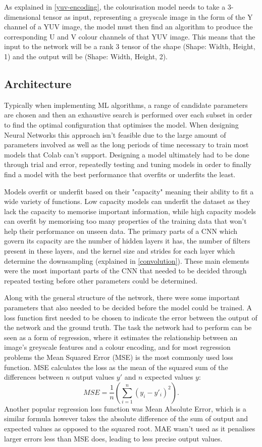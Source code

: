 \documentclass{l4proj}
\begin{document}
As explained in \ref{yuv-encoding}, the colourisation model needs to take a 3-dimensional tensor as input, representing a greyscale image in the form of the Y channel of a YUV image, the model must then find an algorithm to produce the corresponding U and V colour channels of that YUV image. This means that the input to the network will be a rank 3 tensor of the shape (Shape: Width, Height, 1) and the output will be (Shape: Width, Height, 2).

\subsection{Architecture}
Typically when implementing ML algorithms, a range of candidate parameters are chosen and then an exhaustive search is performed over each subset in order to find the optimal configuration that optimises the model. When designing Neural Networks this approach isn't feasible due to the large amount of parameters involved as well as the long periods of time necessary to train most models that Colab can't support. Designing a model ultimately had to be done through trial and error, repeatedly testing and tuning models in order to finally find a model with the best performance that overfits or underfits the least.

Models overfit or underfit based on their "capacity" meaning their ability to fit a wide variety of functions. Low capacity models can underfit the dataset as they lack the capacity to memorise important information, while high capacity models can overfit by memorising too many properties of the training data that won't help their performance on unseen data\cite[p.110]{Goodfellow}. The primary parts of a CNN which govern its capacity are the number of hidden layers it has, the number of filters present in these layers, and the kernel size and strides for each layer which determine the downsampling (explained in \ref{convolution}). These main elements were the most important parts of the CNN that needed to be decided through repeated testing before other parameters could be determined.

Along with the general structure of the network, there were some important parameters that also needed to be decided before the model could be trained. A loss function first needed to be chosen to indicate the error between the output of the network and the ground truth. The task the network had to perform can be seen as a form of regression, where it estimates the relationship between an image's greyscale features and a colour encoding, and for most regression problems the  Mean Squared Error (MSE) is the most commonly used loss function. MSE calculates the loss as the mean of the squared sum of the differences between $n$ output values $y'$ and $n$ expected values $y$: 
\begin{equation}
    MSE = \frac{1}{n}(\sum_{i=1}^{n} (y_i - y'_i)^2).
\end{equation}
Another popular regression loss function was Mean Absolute Error, which is a similar formula however takes the absolute difference of the sum of output and expected values as opposed to the squared root. MAE wasn't used as it penalises larger errors less than MSE does, leading to less precise output values.
\end{document}
